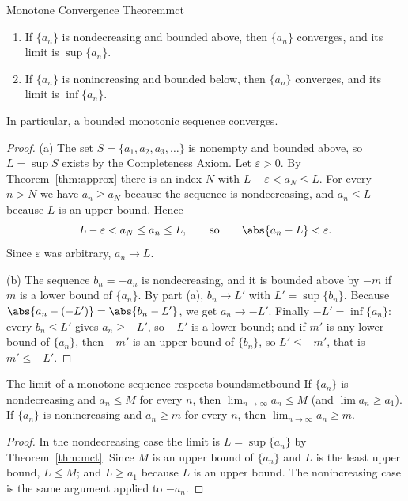 \documentclass[11pt]{article}
\begin{document}
\begin{thm}{Monotone Convergence Theorem}{mct}
\begin{enumerate}[label=(\alph*)]
  \item If $\{a_n\}$ is nondecreasing and bounded above, then $\{a_n\}$ converges, and its limit is $\sup\{a_n\}$.
  \item If $\{a_n\}$ is nonincreasing and bounded below, then $\{a_n\}$ converges, and its limit is $\inf\{a_n\}$.
\end{enumerate}
In particular, a bounded monotonic sequence converges.
\end{thm}
\begin{proof}
(a) The set $S=\{a_1,a_2,a_3,\dots\}$ is nonempty and bounded above, so $L=\sup S$ exists by the Completeness Axiom. Let $\varepsilon>0$. By Theorem~\ref{thm:approx} there is an index $N$ with $L-\varepsilon<a_N\le L$. For every $n>N$ we have $a_n\ge a_N$ because the sequence is nondecreasing, and $a_n\le L$ because $L$ is an upper bound. Hence
\[
L-\varepsilon<a_N\le a_n\le L, \qquad\text{so}\qquad \abs{a_n-L}<\varepsilon .
\]
Since $\varepsilon$ was arbitrary, $a_n\to L$.

(b) The sequence $b_n=-a_n$ is nondecreasing, and it is bounded above by $-m$ if $m$ is a lower bound of $\{a_n\}$. By part (a), $b_n\to L'$ with $L'=\sup\{b_n\}$. Because $\abs{a_n-(-L')}=\abs{b_n-L'}$, we get $a_n\to-L'$. Finally $-L'=\inf\{a_n\}$: every $b_n\le L'$ gives $a_n\ge-L'$, so $-L'$ is a lower bound; and if $m'$ is any lower bound of $\{a_n\}$, then $-m'$ is an upper bound of $\{b_n\}$, so $L'\le -m'$, that is $m'\le -L'$.
\end{proof}

\begin{thm}{The limit of a monotone sequence respects bounds}{mctbound}
If $\{a_n\}$ is nondecreasing and $a_n\le M$ for every $n$, then $\lim_{n\to\infty}a_n\le M$ (and $\lim a_n\ge a_1$). If $\{a_n\}$ is nonincreasing and $a_n\ge m$ for every $n$, then $\lim_{n\to\infty}a_n\ge m$.
\end{thm}
\begin{proof}
In the nondecreasing case the limit is $L=\sup\{a_n\}$ by Theorem~\ref{thm:mct}. Since $M$ is an upper bound of $\{a_n\}$ and $L$ is the least upper bound, $L\le M$; and $L\ge a_1$ because $L$ is an upper bound. The nonincreasing case is the same argument applied to $-a_n$.
\end{proof}
\end{document}
